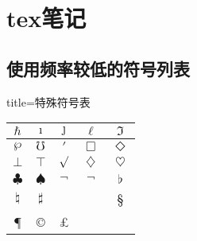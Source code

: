 \chapter{tex笔记}
\section{使用频率较低的符号列表}

\begin{tcblisting}{title=特殊符号表}
 \begin{center}
  \begin{tabular}{|c|c|c|c|c|}
    \hline
    $\hbar$ & $\imath$ & $\jmath$ & $\ell$ & $\Im$\\
    \hline
    $\wp$ & $\mho$ & $\prime$ & $\Box$ & $\Diamond$\\
    \hline
    $\bot$ & $\top$ & $\surd$ & $\diamondsuit$ & $\heartsuit$\\
    \hline
    $\clubsuit$ & $\spadesuit$ & $\neg$ & $\lnot$ & $\flat$\\
    \hline
    $\natural$ & $\sharp$ & \dag & \ddag & \S\\
    \hline
    \P & \copyright & \pounds & \textregistered & \\
    \hline
  \end{tabular}
\end{center}
\end{tcblisting}

